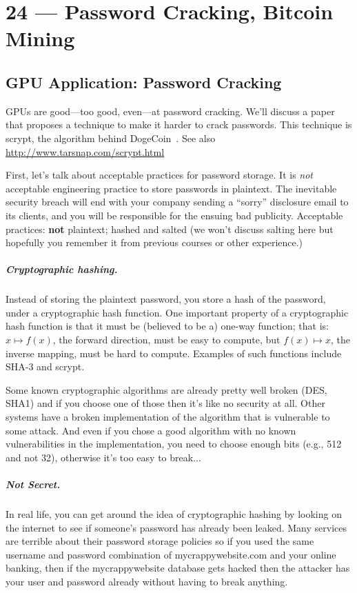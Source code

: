 \documentclass[a4paper]{report}
\begin{document}
\chapter*{24 --- Password Cracking, Bitcoin Mining}


\section*{GPU Application: Password Cracking}

GPUs are good---too good, even---at password cracking. We'll discuss a paper
that proposes a technique to make it harder to crack passwords. This technique
is scrypt, the algorithm behind DogeCoin~\cite{scrypt}. See also \url{http://www.tarsnap.com/scrypt.html}

First, let's talk about acceptable practices for password storage. It is \emph{not}
acceptable engineering practice to store passwords in plaintext. The inevitable security
breach will end with your company sending a ``sorry'' disclosure email to its clients,
and you will be responsible for the ensuing bad publicity. Acceptable practices: {\bf not} plaintext; hashed and salted (we won't discuss salting here but hopefully you remember it from previous courses or other experience.)

\paragraph{Cryptographic hashing.} Instead of storing the plaintext password, you
store a hash of the password, under a cryptographic hash function. One important
property of a cryptographic hash function is that it must be (believed to be a) one-way
function; that is: $x \mapsto f(x)$, the forward direction, must be easy to compute, but
$f(x) \mapsto x$, the inverse mapping, must be hard to compute. Examples of such functions
include SHA-3 and scrypt. 

Some known cryptographic algorithms are already pretty well broken (DES, SHA1) and if you choose one of those then it's like no security at all. Other systems have a broken implementation of the algorithm that is vulnerable to some attack. And even if you chose a good algorithm with no known vulnerabilities in the implementation, you need to choose enough bits (e.g., 512 and not 32), otherwise it's too easy to break...

\paragraph{Not Secret.}
In real life, you can get around the idea of cryptographic hashing by looking on the internet to see if someone's password has already been leaked. Many services are terrible about their password storage policies so if you used the same username and password combination of mycrappywebsite.com and your online banking, then if the mycrappywebsite database gets hacked then the attacker has your user and password already without having to break anything.
\end{document}
